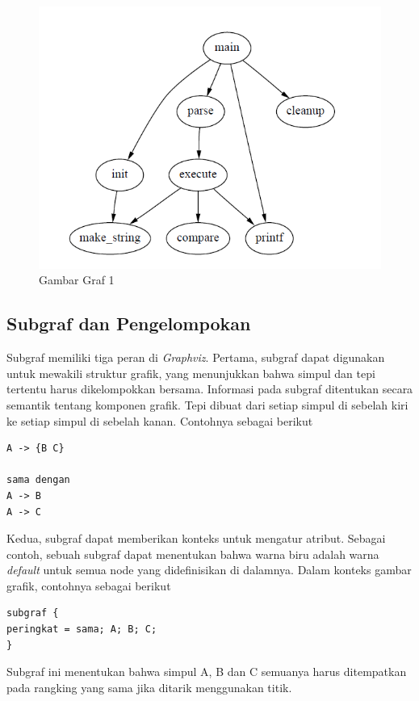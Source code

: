 \begin{figure}[H]
		\centering
		\includegraphics[scale = 0.5]{graph1.png}
		\caption{Gambar Graf 1}
		\label{}
\end{figure}	

\subsection{Subgraf dan Pengelompokan}
\label{sec: Subgraf dan Pengelompokan}
Subgraf memiliki tiga peran di \textit{Graphviz}. Pertama, subgraf dapat digunakan untuk mewakili struktur grafik, yang menunjukkan bahwa simpul dan tepi tertentu harus dikelompokkan bersama. Informasi pada subgraf ditentukan secara semantik tentang komponen grafik. Tepi dibuat dari setiap simpul di sebelah kiri ke setiap simpul di sebelah kanan. Contohnya sebagai berikut 
\begin{lstlisting}
A -> {B C} 

sama dengan
A -> B
A -> C
\end{lstlisting}

Kedua, subgraf dapat memberikan konteks untuk mengatur atribut. Sebagai contoh, sebuah subgraf dapat menentukan bahwa warna biru adalah warna \textit{default} untuk semua node yang didefinisikan di dalamnya. Dalam konteks gambar grafik, contohnya sebagai berikut

\begin{lstlisting}
subgraf {
peringkat = sama; A; B; C;
}
\end{lstlisting}

Subgraf ini menentukan bahwa simpul A, B dan C semuanya harus ditempatkan pada rangking yang sama jika ditarik menggunakan titik.

